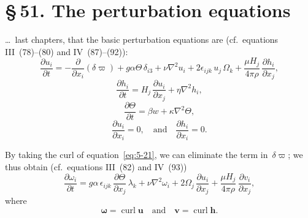 
\newcommand{\figurePlaceholder}[2]{%
  \begin{center}
    \fbox{\parbox{0.85\textwidth}{\centering\textbf{[Figure~#1]}\\[4pt]#2}}
  \end{center}
}

\section*{\S\,51. The perturbation equations}

\noindent
\ldots\ last chapters, that the basic perturbation equations are (cf.\ equations
III~(78)--(80) and IV~(87)--(92)):
\begin{equation}
  \frac{\partial u_i}{\partial t}
  = -\frac{\partial}{\partial x_i}(\delta\varpi)
  + g\alpha\Theta\,\delta_{i3}
  + \nu\nabla^{2}u_i
  + 2\epsilon_{ijk}\,u_j\,\Omega_k
  + \frac{\mu H_j}{4\pi\rho}\,\frac{\partial h_i}{\partial x_j},
  \label{eq:5-21}
\end{equation}
\begin{equation}
  \frac{\partial h_i}{\partial t}
  = H_j\,\frac{\partial u_i}{\partial x_j}+\eta\nabla^{2}h_i,
  \label{eq:5-22}
\end{equation}
\begin{equation}
  \frac{\partial\Theta}{\partial t}
  = \beta w + \kappa\nabla^{2}\Theta,
  \label{eq:5-23}
\end{equation}
\begin{equation}
  \frac{\partial u_i}{\partial x_i} = 0, \quad\text{and}\quad
  \frac{\partial h_i}{\partial x_i} = 0.
  \label{eq:5-24}
\end{equation}

By taking the curl of equation~\eqref{eq:5-21}, we can eliminate the term
in~$\delta\varpi$; we thus obtain (cf.\ equations III~(82) and IV~(93))
\begin{equation}
  \frac{\partial\omega_i}{\partial t}
  = g\alpha\,\epsilon_{ijk}\,\frac{\partial\Theta}{\partial x_j}\,\lambda_k
  + \nu\nabla^{2}\omega_i
  + 2\Omega_j\,\frac{\partial u_i}{\partial x_j}
  + \frac{\mu H_j}{4\pi\rho}\,\frac{\partial v_i}{\partial x_j},
  \label{eq:5-25}
\end{equation}
where
\begin{equation}
  \boldsymbol{\omega} = \operatorname{curl}\mathbf{u}
  \quad\text{and}\quad
  \mathbf{v} = \operatorname{curl}\mathbf{h}.
  \label{eq:5-26}
\end{equation}

